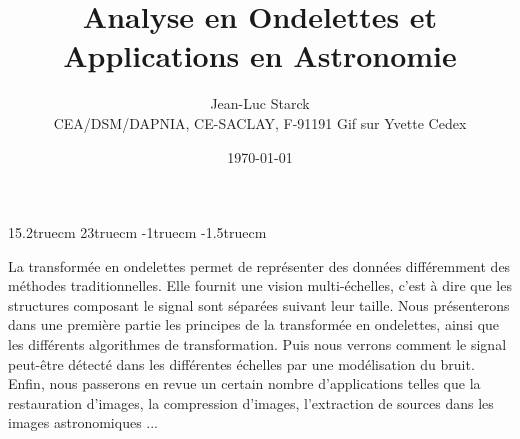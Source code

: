 \setlength{\parskip}{\medskipamount}
\overfullrule 0pt
\textwidth 15.2truecm
\textheight 23truecm
\hoffset -1truecm
\voffset -1.5truecm

\pagestyle{empty}

\title{Analyse en Ondelettes et Applications en Astronomie}

\author{Jean-Luc Starck \\ [12pt]
CEA/DSM/DAPNIA, CE-SACLAY, F-91191 Gif sur Yvette Cedex}
\date{\today}


\maketitle

La transform\'ee en ondelettes permet de repr\'esenter des donn\'ees 
diff\'eremment des m\'ethodes traditionnelles. Elle fournit une vision
multi-\'echelles, c'est \`a dire que les structures composant le signal
sont s\'epar\'ees suivant leur taille. 
Nous pr\'esenterons dans une premi\`ere partie les principes de la 
transform\'ee en ondelettes, ainsi que les diff\'erents algorithmes
de transformation. Puis nous verrons comment le signal peut-\^etre
d\'etect\'e dans les diff\'erentes \'echelles par une mod\'elisation
du bruit. Enfin, nous passerons en revue un certain nombre d'applications
telles que la restauration d'images, la compression d'images, l'extraction
de sources dans les images astronomiques ...


